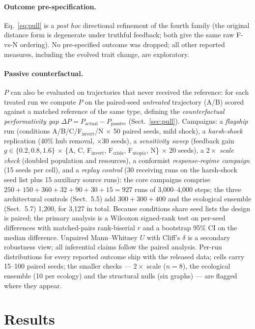 \documentclass{svproc}
\begin{document}
\paragraph{Outcome pre-specification.} Eq.~\ref{eq:pull} is a \emph{post hoc}
directional refinement of the fourth family (the original distance form is
degenerate under truthful feedback; both give the same raw F-vs-N ordering).
No pre-specified outcome was dropped; all other reported measures, including
the evolved trait change, are exploratory.

\paragraph{Passive counterfactual.} $P$ can also be evaluated on trajectories
that never received the reference: for each treated run we compute $P$ on the
paired-seed \emph{untreated} trajectory (A/B) scored against a matched
reference of the same type, defining the
\emph{counterfactual performativity gap} $\Delta P = P_{\mathrm{actual}} -
P_{\mathrm{passive}}$ (Sect.~\ref{sec:pull}). Campaigns: a \emph{flagship} run (conditions
A/B/C/F$_{\mathrm{invert}}$/N $\times$ 50 paired seeds, mild shock), a
\emph{harsh-shock} replication (40\% hub removal, $\times$30 seeds),
a \emph{sensitivity sweep} (feedback gain $g\in\{0.2,0.8,1.6\}$ $\times$
\{A, C, F$_{\mathrm{invert}}$, F$_{\mathrm{crisis}}$, F$_{\mathrm{utopia}}$,
N\} $\times$ 20 seeds), a $2\times$ \emph{scale check} (doubled population and resources), a conformist \emph{response-regime campaign} (15 seeds per cell), and a \emph{replay control} (30 receiving runs on the harsh-shock seed list plus 15 auxiliary source runs): the core campaigns comprise $250+150+360+32+90+30+15 = 927$ runs of 3{,}000--4{,}000 steps; the three architectural controls (Sect.~5.5) add $300+300+400$ and the ecological ensemble (Sect.~5.7) 1{,}200, for 3{,}127 in total. Because conditions share seed lists the design is paired; the primary
analysis is a Wilcoxon signed-rank test on per-seed differences with
matched-pairs rank-biserial $r$ and a bootstrap 95\% CI on the median
difference. Unpaired Mann--Whitney $U$ with Cliff's $\delta$ is a secondary
robustness view; all inferential claims follow the paired analysis. Per-run distributions for every
reported outcome ship with the released data; cells carry 15--100 paired
seeds; the smaller checks --- $2\times$ scale ($n=8$), the ecological
ensemble (10 per ecology) and the structural nulls (six graphs) --- are
flagged where they appear.

\section{Results}
\end{document}
